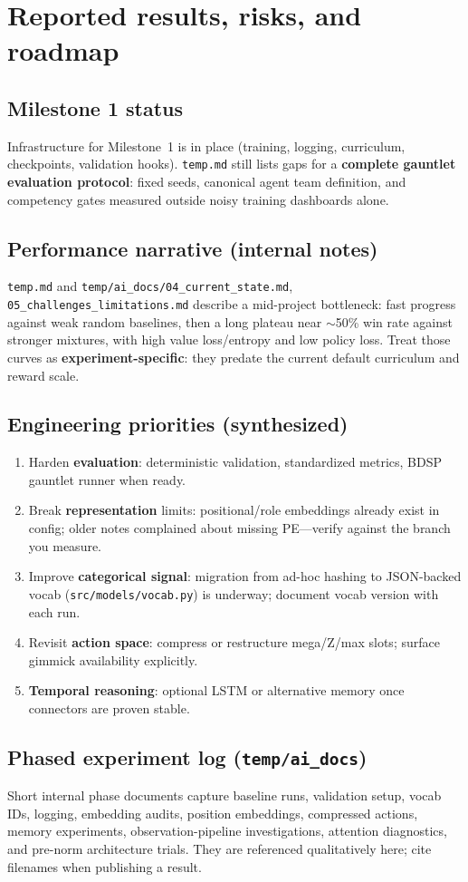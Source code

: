 \chapter{Reported results, risks, and roadmap}

\section{Milestone 1 status}
Infrastructure for Milestone~1 is in place (training, logging, curriculum, checkpoints, validation hooks). \texttt{temp.md} still lists gaps for a \textbf{complete gauntlet evaluation protocol}: fixed seeds, canonical agent team definition, and competency gates measured outside noisy training dashboards alone.

\section{Performance narrative (internal notes)}
\texttt{temp.md} and \texttt{temp/ai\_docs/04\_current\_state.md}, \texttt{05\_challenges\_limitations.md} describe a mid-project bottleneck: fast progress against weak random baselines, then a long plateau near $\sim$50\% win rate against stronger mixtures, with high value loss/entropy and low policy loss. Treat those curves as \textbf{experiment-specific}: they predate the current default curriculum and reward scale.

\section{Engineering priorities (synthesized)}
\begin{enumerate}
  \item Harden \textbf{evaluation}: deterministic validation, standardized metrics, BDSP gauntlet runner when ready.
  \item Break \textbf{representation} limits: positional/role embeddings already exist in config; older notes complained about missing PE---verify against the branch you measure.
  \item Improve \textbf{categorical signal}: migration from ad-hoc hashing to JSON-backed vocab (\texttt{src/models/vocab.py}) is underway; document vocab version with each run.
  \item Revisit \textbf{action space}: compress or restructure mega/Z/max slots; surface gimmick availability explicitly.
  \item \textbf{Temporal reasoning}: optional LSTM or alternative memory once connectors are proven stable.
\end{enumerate}

\section{Phased experiment log (\texttt{temp/ai\_docs})}
Short internal phase documents capture baseline runs, validation setup, vocab IDs, logging, embedding audits, position embeddings, compressed actions, memory experiments, observation-pipeline investigations, attention diagnostics, and pre-norm architecture trials. They are referenced qualitatively here; cite filenames when publishing a result.
